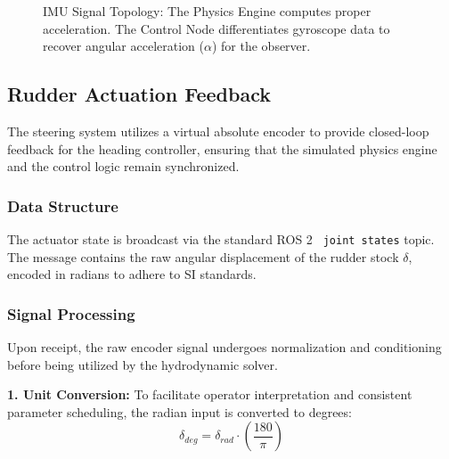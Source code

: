 \documentclass[12pt, a4paper, oneside]{report}
\begin{document}
\begin{figure}[H]
{
    }
    \caption{IMU Signal Topology: The Physics Engine computes proper acceleration. The Control Node differentiates gyroscope data to recover angular acceleration ($\alpha$) for the observer.}
    \label{fig:imu_topology}
\end{figure}

\subsection{Rudder Actuation Feedback}
The steering system utilizes a virtual absolute encoder to provide closed-loop feedback for the heading controller, ensuring that the simulated physics engine and the control logic remain synchronized.

\subsubsection{Data Structure}
The actuator state is broadcast via the standard ROS 2 \texttt{ joint states} topic. The message contains the raw angular displacement of the rudder stock $\delta$, encoded in radians to adhere to SI standards.

\subsubsection{Signal Processing}
Upon receipt, the raw encoder signal undergoes normalization and conditioning before being utilized by the hydrodynamic solver.

\textbf{1. Unit Conversion:}
To facilitate operator interpretation and consistent parameter scheduling, the radian input is converted to degrees:
\begin{equation}
    \delta_{deg} = \delta_{rad} \cdot \left( \frac{180}{\pi} \right)
\end{equation}
\end{document}
